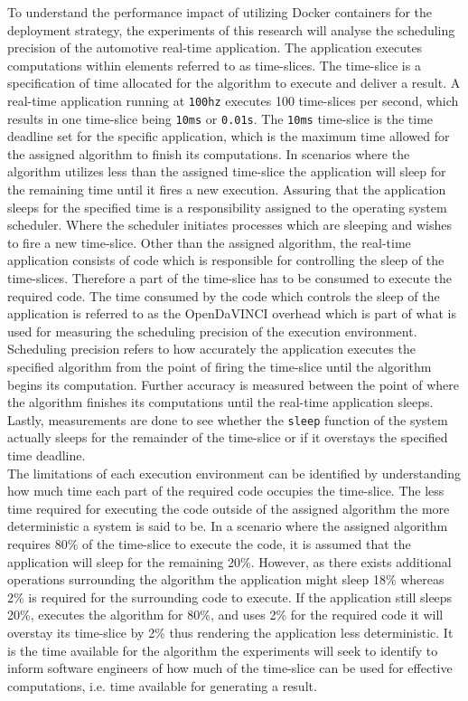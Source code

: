 To understand the performance impact of utilizing Docker containers for the deployment strategy, the experiments of this research will analyse the scheduling precision of the automotive real-time application. The application executes computations within elements referred to as time-slices. The time-slice is a specification of time allocated for the algorithm to execute and deliver a result. A real-time application running at \texttt{100hz} executes 100 time-slices per second, which results in one time-slice being \texttt{10ms} or \texttt{0.01s}. The \texttt{10ms} time-slice is the time deadline set for the specific application, which is the maximum time allowed for the assigned algorithm to finish its computations. In scenarios where the algorithm utilizes less than the assigned time-slice the application will sleep for the remaining time until it fires a new execution. Assuring that the application sleeps for the specified time is a responsibility assigned to the operating system scheduler. Where the scheduler initiates processes which are sleeping and wishes to fire a new time-slice. Other than the assigned algorithm, the real-time application consists of code which is responsible for controlling the sleep of the time-slices. Therefore a part of the time-slice has to be consumed to execute the required code. The time consumed by the code which controls the sleep of the application is referred to as the OpenDaVINCI overhead which is part of what is used for measuring the scheduling precision of the execution environment.\\

Scheduling precision refers to how accurately the application executes the specified algorithm from the point of firing the time-slice until the algorithm begins its computation. Further accuracy is measured between the point of where the algorithm finishes its computations until the real-time application sleeps. Lastly, measurements are done to see whether the \texttt{sleep} function of the system actually sleeps for the remainder of the time-slice or if it overstays the specified time deadline.\\

The limitations of each execution environment can be identified by understanding how much time each part of the required code occupies the time-slice. The less time required for executing the code outside of the assigned algorithm the more deterministic a system is said to be. In a scenario where the assigned algorithm requires 80\% of the time-slice to execute the code, it is assumed that the application will sleep for the remaining 20\%. However, as there exists additional operations surrounding the algorithm the application might sleep 18\% whereas 2\% is required for the surrounding code to execute. If the application still sleeps 20\%, executes the algorithm for 80\%, and uses 2\% for the required code it will overstay its time-slice by 2\% thus rendering the application less deterministic. It is the time available for the algorithm the experiments will seek to identify to inform software engineers of how much of the time-slice can be used for effective computations, i.e. time available for generating a result.\\



